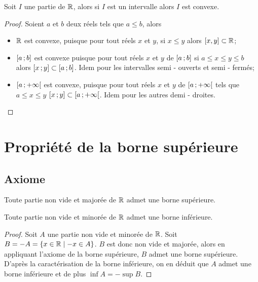 \begin{theo}
  \label{theo:partieconvexe1}
  Soit \(I\) une partie de \(\mathbb{R}\), alors si \(I\) est un intervalle alors \(I\) 
  est convexe.
\end{theo}
\begin{proof}
  Soient \(a\) et \(b\) deux réels tels que \(a\leqslant b\), alors
  \begin{itemize}
    \item \(\mathbb{R}\) est convexe, puisque pour tout réels \(x\) et \(y\), si 
      \(x\leqslant y\) alors \([x, y]\subset \mathbb{R}\);
    \item \(\left[ a \, ;  b \right]\) est convexe puisque pour tout réels \(x\) et 
      \(y\) de \(\left[ a \, ;  b \right]\) si \(a\leqslant x\leqslant y\leqslant b\) 
      alors \(\left[ x \, ;  y \right]\subset \left[ a \, ;  b \right]\). Idem pour les 
      intervalles semi - ouverts et semi - fermés;
    \item \(\left[ a \, ;   + \infty \right[\) est convexe, puisque pour tout réels 
      \(x\) et \(y\) de \(\left[ a \, ;   + \infty \right[\) tels que \(a\leqslant 
      x\leqslant y\) \(\left[ x \, ;  y \right]\subset \left[ a \, ;   + \infty \right[\).  
      Idem pour les autres demi - droites.
  \end{itemize}
\end{proof}

\section{Propriété de la borne supérieure}

\subsection{Axiome}

\begin{theo}
  \label{theo:bornesup}
  Toute partie non vide et majorée de \(\mathbb{R}\) admet une borne supérieure.
\end{theo}
\begin{theo}
  Toute partie non vide et minorée de \(\mathbb{R}\) admet une borne inférieure.
\end{theo}
\begin{proof}
  Soit \(A\) une partie non vide et minorée de \(\mathbb{R}\). Soit \(B = -A = 
  \left\{x\in \mathbb{R}\mathrel{}\middle|\mathrel{} - x \in A\right\}\). \(B\) est donc non vide et majorée, alors en 
  appliquant l'axiome de la borne supérieure, \(B\) admet une borne supérieure.  
  D'après la caractérisation de la borne inférieure, on en déduit que \(A\) 
  admet une borne inférieure et de plus \(\inf A = -\sup B\).
\end{proof}

